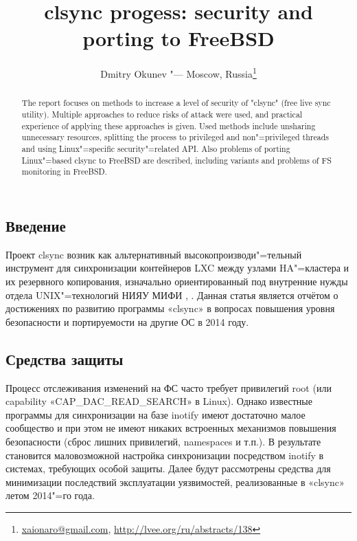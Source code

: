 \documentclass[10pt, a5paper]{article}
\begin{document}
\title{clsync progess: security and porting to FreeBSD}
\author{Dmitry Okunev "--- Moscow, Russia\footnote{\url{xaionaro@gmail.com}, \url{http://lvee.org/ru/abstracts/138}}}
\maketitle
\begin{abstract}
The report focuses on methods to increase a level of security of "clsync" (free live sync utility). Multiple approaches to reduce risks of attack were used, and practical experience of applying these approaches is given. Used methods include unsharing un\-necessary resources, splitting the process to privileged and non"=privileged threads and using Linux"=specific security"=related API. Also problems of porting Linux"=based clsync to FreeBSD are described, including variants and problems of FS monitoring in FreeBSD.
\end{abstract}
\subsection*{Введение}

Проект clsync возник как альтернативный высокопроизводи"=\linebreak тельный инструмент для синхронизации контейнеров LXC между узлами HA"=кластера и их резервного копирования, изначально ориентированный под внутренние нужды отдела UNIX"=технологий НИЯУ МИФИ \cite{Okunev1}, \cite{Okunev2}. Данная статья является отчётом о достижениях по развитию программы «clsync» в вопросах повышения уровня безопасности и портируемости на другие ОС в 2014 году.

\subsection*{Средства защиты}

Процесс отслеживания изменений на ФС часто требует  привилегий root (или capability «CAP\_DAC\_READ\_SEARCH» \cite{Okunev3} в Linux). Однако известные программы \cite{Okunev4} для синхронизации на базе inotify \cite{Okunev5} имеют достаточно малое сообщество и при этом не имеют никаких встроенных механизмов повышения безопасности (сброс лишних привилегий, namespaces и т.п.). В результате становится маловозможной настройка синхронизации посредством inotify в системах, требующих особой защиты. Далее будут рассмотрены средства для минимизации последствий эксплуатации уязвимостей, реализованные в «clsync» летом 2014"=го года.
\end{document}
